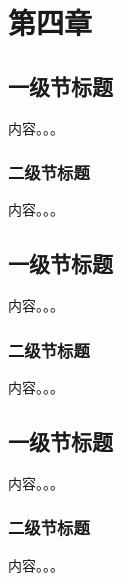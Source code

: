\chapter{第四章}

\section{一级节标题}

内容。。。

\subsection{二级节标题}

内容。。。

\section{一级节标题}

内容。。。

\subsection{二级节标题}

内容。。。

\section{一级节标题}

内容。。。

\subsection{二级节标题}

内容。。。